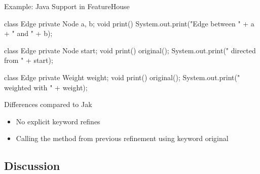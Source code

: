\begin{frame}[fragile]{Example: Java Support in FeatureHouse}
	\begin{mycolumns}[widths={60,40},animation=none]
{\small
\begin{codetight}{}
class Edge {
	private Node a, b;
	void print() {
		System.out.print("Edge between " + a + " and " + b);
	}
}
\end{codetight}
\begin{codetight}{}
class Edge {
	private Node start;
	void print() {
		original();
		System.out.print(" directed from " + start);
	}
}
\end{codetight}
\begin{codetight}{}
class Edge {
	private Weight weight;
	void print() {
		original();
		System.out.print(" weighted with " + weight);
	}
}
\end{codetight}
}
	\mynextcolumn
		\begin{note}{Differences compared to Jak}
			\begin{itemize}
				\item No explicit keyword refines 
				\item Calling the method from previous refinement using keyword original
			\end{itemize}
		\end{note}
	\end{mycolumns}
\end{frame}

\subsection{Discussion}

